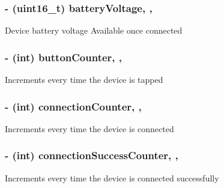 \subsubsection[{battery\+Voltage}]{\setlength{\rightskip}{0pt plus 5cm}-\/ (uint16\+\_\+t) battery\+Voltage\hspace{0.3cm}{\ttfamily [read]}, {\ttfamily [nonatomic]}, {\ttfamily [assign]}}\label{interface_le_snf_device_a27787e4c4cac8f6d4e79fbb0f02ab596}
Device battery voltage Available once connected \hypertarget{interface_le_snf_device_aa38afc50f6dd03cc391715cbc8186111}{}
\subsubsection[{button\+Counter}]{\setlength{\rightskip}{0pt plus 5cm}-\/ (int) button\+Counter\hspace{0.3cm}{\ttfamily [read]}, {\ttfamily [nonatomic]}, {\ttfamily [assign]}}\label{interface_le_snf_device_aa38afc50f6dd03cc391715cbc8186111}
Increments every time the device is tapped \hypertarget{interface_le_snf_device_ad640963aa99ea3073ecc6d526d75c113}{}
\subsubsection[{connection\+Counter}]{\setlength{\rightskip}{0pt plus 5cm}-\/ (int) connection\+Counter\hspace{0.3cm}{\ttfamily [read]}, {\ttfamily [nonatomic]}, {\ttfamily [assign]}}\label{interface_le_snf_device_ad640963aa99ea3073ecc6d526d75c113}
Increments every time the device is connected \hypertarget{interface_le_snf_device_a8a5dfc51f0558ed63728b030986603f1}{}
\subsubsection[{connection\+Success\+Counter}]{\setlength{\rightskip}{0pt plus 5cm}-\/ (int) connection\+Success\+Counter\hspace{0.3cm}{\ttfamily [read]}, {\ttfamily [nonatomic]}, {\ttfamily [assign]}}\label{interface_le_snf_device_a8a5dfc51f0558ed63728b030986603f1}
Increments every time the device is connected successfully \hypertarget{interface_le_snf_device_ab0bd07be677cb82e236c31730a4e56ae}{}
